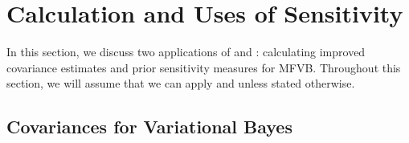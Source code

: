 \documentclass{article}\usepackage[]{graphicx}\usepackage[]{color}
\theoremstyle{definition}
\theoremstyle{plain}
\theoremstyle{plain}
\theoremstyle{plain}
\theoremstyle{definition}
\theoremstyle{plain}
\theoremstyle{plain}
\begin{document}
\section{Calculation and Uses of Sensitivity
\label{sec:sensitivity_in_action}}
In this section, we discuss two applications of 
and : calculating improved
covariance estimates and prior sensitivity measures for MFVB. Throughout
this section, we will assume that we can apply 
and  unless stated otherwise.

\subsection{Covariances for Variational Bayes\label{subsec:lrvb_cov}}
\end{document}
